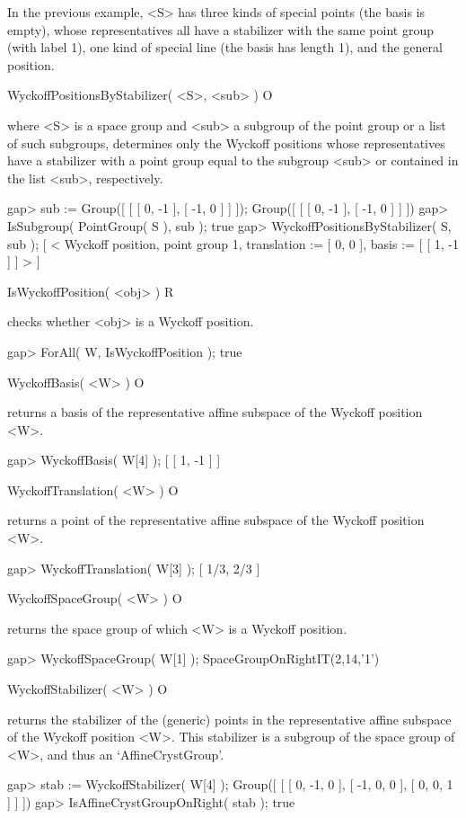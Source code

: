 In the previous example, <S> has three kinds of special points
(the basis is empty), whose representatives all have a stabilizer 
with the same point group (with label 1), one kind of special line
(the basis has length 1), and the general position.

\>WyckoffPositionsByStabilizer( <S>, <sub> ) O

where <S> is a space group and <sub> a subgroup of the point group or
a list of such subgroups, determines only the Wyckoff positions whose
representatives have a stabilizer with a point group equal to the 
subgroup <sub> or contained in the list <sub>, respectively.

\beginexample
gap> sub := Group([ [ [ 0, -1 ], [ -1, 0 ] ] ]);
Group([ [ [ 0, -1 ], [ -1, 0 ] ] ])
gap> IsSubgroup( PointGroup( S ), sub );
true
gap> WyckoffPositionsByStabilizer( S, sub );
[ < Wyckoff position, point group 1, translation := [ 0, 0 ], 
    basis := [ [ 1, -1 ] ] >
     ]
\endexample

\>IsWyckoffPosition( <obj> ) R

checks whether <obj> is a Wyckoff position.

\beginexample
gap> ForAll( W, IsWyckoffPosition );
true
\endexample

\>WyckoffBasis( <W> ) O

returns a basis of the representative affine subspace of the Wyckoff 
position <W>.

\beginexample
gap> WyckoffBasis( W[4] );
[ [ 1, -1 ] ]
\endexample

\>WyckoffTranslation( <W> ) O

returns a point of the representative affine subspace of the Wyckoff 
position <W>.

\beginexample
gap> WyckoffTranslation( W[3] );
[ 1/3, 2/3 ]
\endexample

\>WyckoffSpaceGroup( <W> ) O

returns the space group of which <W> is a Wyckoff position.

\beginexample
gap> WyckoffSpaceGroup( W[1] );
SpaceGroupOnRightIT(2,14,'1')
\endexample

\>WyckoffStabilizer( <W> ) O

returns the stabilizer of the (generic) points in the representative
affine subspace of the Wyckoff position <W>. This stabilizer is a
subgroup of the space group of <W>, and thus an `AffineCrystGroup'.

\beginexample
gap> stab := WyckoffStabilizer( W[4] );
Group([ [ [ 0, -1, 0 ], [ -1, 0, 0 ], [ 0, 0, 1 ] ] ])
gap> IsAffineCrystGroupOnRight( stab );
true
\endexample

